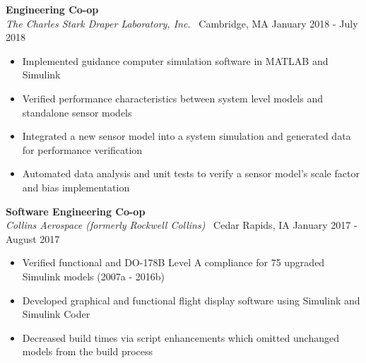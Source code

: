 \documentclass[overlapped, 11pt]{res}
\begin{document}
\begin{resume}
\begin{itemize}
            \textbf{Engineering Co-op}\\
            \emph{The Charles Stark Draper Laboratory, Inc.} \textbar 
                \ Cambridge, MA \hfill January 2018 - July 2018
            \begin{itemize}
                \item Implemented guidance computer simulation software in MATLAB and Simulink
                \item Verified performance characteristics between system level models and standalone sensor models
                \item Integrated a new sensor model into a system simulation and generated data for performance verification
                \item Automated data analysis and unit tests to verify a sensor model's scale factor and bias implementation
            \end{itemize}

            \textbf{Software Engineering Co-op}\\
            \emph{Collins Aerospace (formerly Rockwell Collins)} \textbar 
                \ Cedar Rapids, IA \hfill January 2017 - August 2017
            \begin{itemize}
                \item Verified functional and DO-178B Level A compliance for 75 upgraded Simulink models (2007a - 2016b)
                \item Developed graphical and functional flight display software using Simulink and Simulink Coder
                \item Decreased build times via script enhancements which omitted unchanged models from the build process
            \end{itemize}

        

\end{itemize}
\end{resume}
\end{document}
